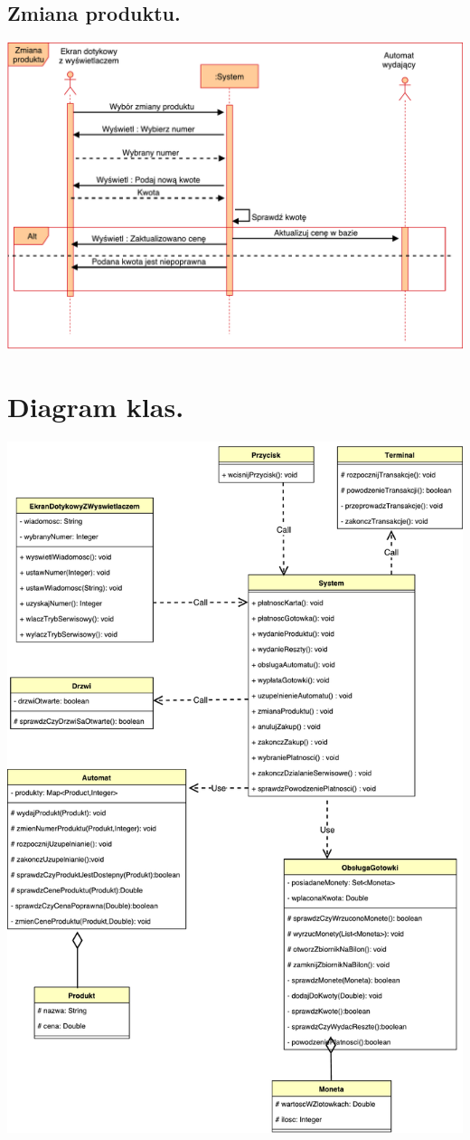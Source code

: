 \documentclass[11pt]{article}
\begin{document}
		\subsection{Zmiana produktu.}
		\begin{center}
			\includegraphics[scale=0.65]{ZmianaProduktu.pdf}
		\end{center}
		\newpage
		\section{Diagram klas.}
		\begin{center}
			\includegraphics[scale=0.65]{klas.pdf}
		\end{center}
		\newpage
\end{document}

